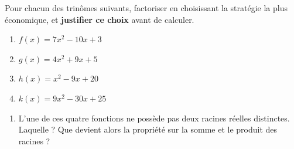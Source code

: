 

Pour chacun des trinômes suivants, factoriser en choisissant la stratégie la
plus économique, et \textbf{justifier ce choix} avant de calculer.

\begin{enumerate}
  \item[\textbf{a.}] $f(x) = 7x^2 - 10x + 3$
  \item[\textbf{b.}] $g(x) = 4x^2 + 9x + 5$
  \item[\textbf{c.}] $h(x) = x^2 - 9x + 20$
  \item[\textbf{d.}] $k(x) = 9x^2 - 30x + 25$
\end{enumerate}

\begin{enumerate}
  \item[\textbf{e.}] L'une de ces quatre fonctions ne possède pas deux racines
        réelles distinctes. Laquelle ? Que devient alors la propriété sur la
        somme et le produit des racines ?
\end{enumerate}

